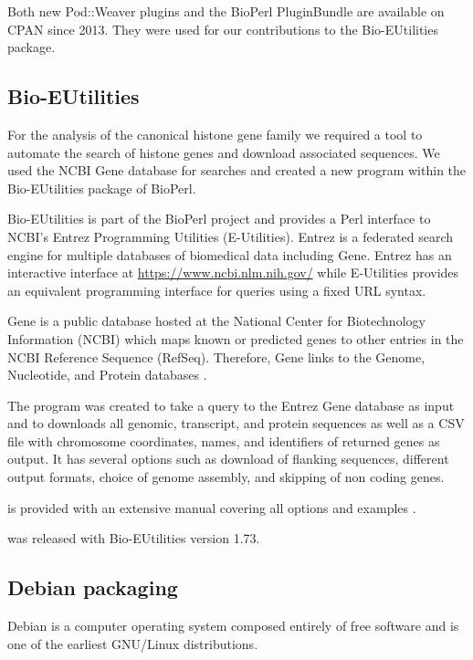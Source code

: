 Both new Pod::Weaver plugins and the BioPerl PluginBundle are available
on CPAN since 2013.  They were used for our contributions to the
Bio-EUtilities package.

\subsection{Bio-EUtilities}

For the analysis of the canonical histone gene
family  we required a tool to
automate the search of histone genes and download associated sequences.
We used the NCBI Gene database for searches and
created a new program 
within the Bio-EUtilities package of BioPerl.

Bio-EUtilities is part of the BioPerl project and provides a Perl
interface to NCBI's Entrez Programming Utilities (E-Utilities).
Entrez is a federated search engine for multiple databases of
biomedical data including Gene.  Entrez has an
interactive interface at \url{https://www.ncbi.nlm.nih.gov/} while
E-Utilities provides an equivalent
programming interface for queries using a fixed
URL syntax.

Gene is a public database hosted at the National Center for
Biotechnology Information (NCBI) which maps known or predicted genes
to other entries in the NCBI Reference Sequence (RefSeq).  Therefore, Gene
links to the Genome, Nucleotide, and Protein databases \citep{gene-database}.

The program  was
created to take a query to the Entrez Gene database as input and
to downloads all genomic, transcript, and protein sequences as well
as a CSV file with chromosome coordinates, names, and identifiers of
returned genes as output.
It has several options such as download of flanking sequences, different
output formats, choice of genome assembly, and skipping of non coding
genes.

is provided with an extensive manual covering all options
and examples .

 was released with
Bio-EUtilities version 1.73.

\subsection{Debian packaging}

Debian is a computer operating system
composed entirely of free software and is one of the earliest GNU/Linux
distributions.

